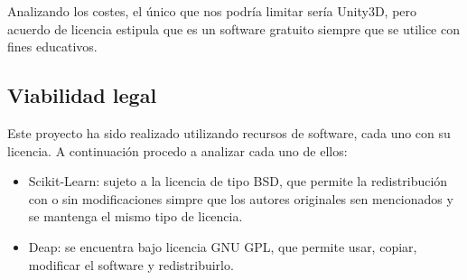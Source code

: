 Analizando los costes, el único que nos podría limitar sería Unity3D, pero acuerdo de licencia estipula que es un software gratuito siempre que se utilice con fines educativos.

\subsection{Viabilidad legal}

Este proyecto ha sido realizado utilizando recursos de software, cada uno con su licencia. A continuación procedo a analizar cada uno de ellos:
\begin{itemize}
    \item Scikit-Learn: sujeto a la licencia de tipo BSD, que permite la redistribución con o sin modificaciones simpre que los autores originales sen mencionados y se mantenga el mismo tipo de licencia.
    \item Deap: se encuentra bajo licencia GNU GPL, que permite usar, copiar, modificar el software y redistribuirlo.
\end{itemize}
